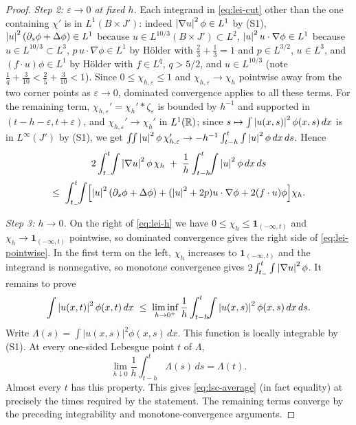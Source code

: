 \documentclass[11pt,reqno]{amsart}
\begin{document}
\begin{proof}
\emph{Step 2: $\varepsilon\to0$ at fixed $h$.} Each integrand in
\eqref{eq:lei-cut} other than the one containing $\chi'$ is in
$L^{1}(B\times J')$: indeed $\left\lvert \nabla u \right\rvert^{2}\phi\in L^{1}$ by (S1),
$\left\lvert u \right\rvert^{2}(\partial_{s}\phi+\Delta\phi)\in L^{1}$ because
$u\in L^{10/3}(B\times J')\subset L^{2}$, $\left\lvert u \right\rvert^{2}u\cdot\nabla\phi\in L^{1}$
because $u\in L^{10/3}\subset L^{3}$, $p\,u\cdot\nabla\phi\in L^{1}$ by
H\"older with $\tfrac23+\tfrac13=1$ and $p\in L^{3/2}$, $u\in L^{3}$, and
$(f\cdot u)\phi\in L^{1}$ by H\"older with $f\in L^{q}$, $q>5/2$, and
$u\in L^{10/3}$ (note $\tfrac1q+\tfrac{3}{10}<\tfrac25+\tfrac3{10}<1$). Since
$0\le\chi_{h,\varepsilon}\le1$ and $\chi_{h,\varepsilon}\to\chi_{h}$ pointwise
away from the two corner points as $\varepsilon\to0$, dominated convergence
applies to all these terms. For the remaining term, $\chi_{h,\varepsilon}'
=\chi_{h}'*\zeta_{\varepsilon}$ is bounded by $h^{-1}$ and supported in
$(t-h-\varepsilon,t+\varepsilon)$, and $\chi_{h,\varepsilon}'\to\chi_{h}'$ in
$L^{1}(\mathbb{R})$; since $s\mapsto\int\left\lvert u(x,s) \right\rvert^{2}\phi(x,s)\,dx$ is in
$L^{\infty}(J')$ by (S1), we get
$\iint\left\lvert u \right\rvert^{2}\phi\,\chi_{h,\varepsilon}'\to
 -h^{-1}\int_{t-h}^{t}\int\left\lvert u \right\rvert^{2}\phi\,dx\,ds$. Hence
\begin{multline}\label{eq:lei-h}
  2\int_{t_{-}}^{t}\!\!\int\left\lvert \nabla u \right\rvert^{2}\phi\,\chi_{h}
  \;+\;\frac1h\int_{t-h}^{t}\!\!\int\left\lvert u \right\rvert^{2}\phi\,dx\,ds\\
  \le\;\int_{t_{-}}^{t}\!\!\int\Bigl[\left\lvert u \right\rvert^{2}(\partial_{s}\phi+\Delta\phi)
    +(\left\lvert u \right\rvert^{2}+2p)u\cdot\nabla\phi+2(f\cdot u)\phi\Bigr]\chi_{h} .
\end{multline}

\emph{Step 3: $h\to0$.} On the right of \eqref{eq:lei-h} we have
$0\le\chi_{h}\le\mathbf{1}_{(-\infty,t)}$ and $\chi_{h}\to\mathbf{1}_{(-\infty,t)}$
pointwise, so dominated convergence gives the right side of
\eqref{eq:lei-pointwise}. In the first term on the left, $\chi_{h}$ increases to
$\mathbf{1}_{(-\infty,t)}$ and the integrand is nonnegative, so monotone
convergence gives $2\int_{t_{-}}^{t}\int\left\lvert \nabla u \right\rvert^{2}\phi$. It remains to
prove
\begin{equation}\label{eq:lsc-average}
  \int\left\lvert u(x,t) \right\rvert^{2}\phi(x,t)\,dx
  \;\le\;\liminf_{h\to0^{+}}\frac1h\int_{t-h}^{t}\!\!\int\left\lvert u(x,s) \right\rvert^{2}\phi(x,s)\,dx\,ds .
\end{equation}
Write $\Lambda(s)=\int|u(x,s)|^2\phi(x,s)\,dx$.
This function is locally integrable by (S1). At every one-sided
Lebesgue point $t$ of $\Lambda$,
\[
 \lim_{h\downarrow0}\frac1h\int_{t-h}^t\Lambda(s)\,ds=\Lambda(t).
\]
Almost every $t$ has this property. This gives \eqref{eq:lsc-average}
(in fact equality) at precisely the times required by the statement.
The remaining terms converge by the preceding integrability and
monotone-convergence arguments.
\end{proof}
\end{document}
